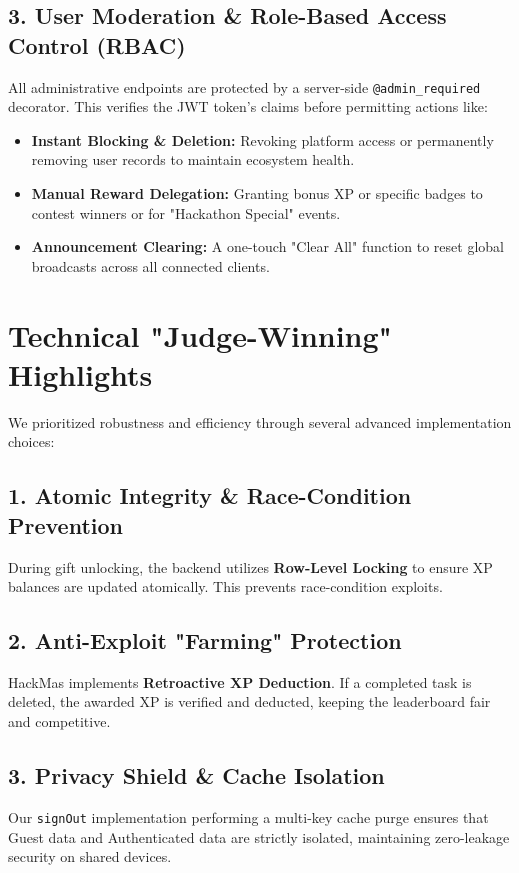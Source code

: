 \documentclass[12pt,a4paper]{article}
\begin{document}
\subsection{3. User Moderation \& Role-Based Access Control (RBAC)}
All administrative endpoints are protected by a server-side \texttt{@admin\_required} decorator. This verifies the JWT token's claims before permitting actions like:
\begin{itemize}
    \item \textbf{Instant Blocking \& Deletion:} Revoking platform access or permanently removing user records to maintain ecosystem health.
    \item \textbf{Manual Reward Delegation:} Granting bonus XP or specific badges to contest winners or for "Hackathon Special" events.
    \item \textbf{Announcement Clearing:} A one-touch "Clear All" function to reset global broadcasts across all connected clients.
\end{itemize}

\section{Technical "Judge-Winning" Highlights}
We prioritized robustness and efficiency through several advanced implementation choices:

\subsection{1. Atomic Integrity \& Race-Condition Prevention}
During gift unlocking, the backend utilizes \textbf{Row-Level Locking} to ensure XP balances are updated atomically. This prevents race-condition exploits.

\subsection{2. Anti-Exploit "Farming" Protection}
HackMas implements \textbf{Retroactive XP Deduction}. If a completed task is deleted, the awarded XP is verified and deducted, keeping the leaderboard fair and competitive.

\subsection{3. Privacy Shield \& Cache Isolation}
Our \texttt{signOut} implementation performing a multi-key cache purge ensures that Guest data and Authenticated data are strictly isolated, maintaining zero-leakage security on shared devices.
\end{document}
